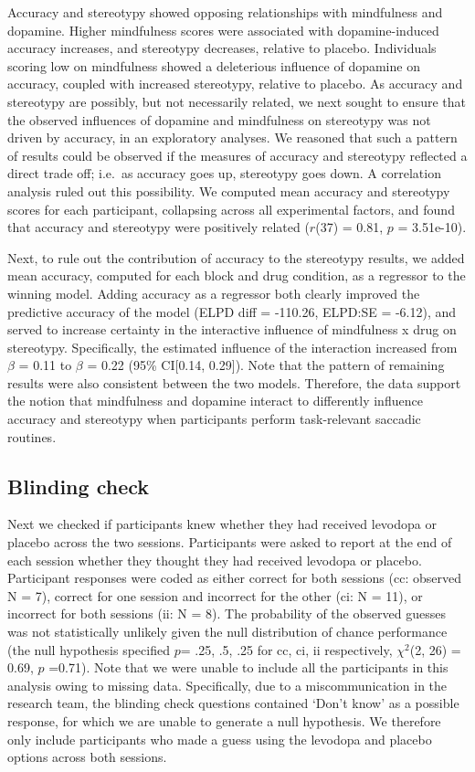 \documentclass{article}
\begin{document}
Accuracy and stereotypy showed opposing relationships with mindfulness
and dopamine. Higher mindfulness scores were associated with
dopamine-induced accuracy increases, and stereotypy decreases, relative
to placebo. Individuals scoring low on mindfulness showed a deleterious
influence of dopamine on accuracy, coupled with increased stereotypy,
relative to placebo. As accuracy and stereotypy are possibly, but not
necessarily related, we next sought to ensure that the observed
influences of dopamine and mindfulness on stereotypy was not driven by
accuracy, in an exploratory analyses. We reasoned that such a pattern of
results could be observed if the measures of accuracy and stereotypy
reflected a direct trade off; i.e.~as accuracy goes up, stereotypy goes
down. A correlation analysis ruled out this possibility. We computed
mean accuracy and stereotypy scores for each participant, collapsing
across all experimental factors, and found that accuracy and stereotypy
were positively related (\(r\)(37) = 0.81, \(p\) = 3.51e-10).

Next, to rule out the contribution of accuracy to the stereotypy
results, we added mean accuracy, computed for each block and drug
condition, as a regressor to the winning model. Adding accuracy as a
regressor both clearly improved the predictive accuracy of the model
(ELPD diff = -110.26, ELPD:SE = -6.12), and served to increase certainty
in the interactive influence of mindfulness x drug on stereotypy.
Specifically, the estimated influence of the interaction increased from
\(\beta\) = 0.11 to \(\beta\) = 0.22 (95\% CI{[}0.14, 0.29{]}). Note
that the pattern of remaining results were also consistent between the
two models. Therefore, the data support the notion that mindfulness and
dopamine interact to differently influence accuracy and stereotypy when
participants perform task-relevant saccadic routines.

\hypertarget{blinding-check}{%
\subsection{Blinding check}\label{blinding-check}}

Next we checked if participants knew whether they had received levodopa
or placebo across the two sessions. Participants were asked to report at
the end of each session whether they thought they had received levodopa
or placebo. Participant responses were coded as either correct for both
sessions (cc: observed N = 7), correct for one session and incorrect for
the other (ci: N = 11), or incorrect for both sessions (ii: N = 8). The
probability of the observed guesses was not statistically unlikely given
the null distribution of chance performance (the null hypothesis
specified \(p\)= .25, .5, .25 for cc, ci, ii respectively, \(\chi^2\)(2,
26) = 0.69, \(p\) =0.71). Note that we were unable to include all the
participants in this analysis owing to missing data. Specifically, due
to a miscommunication in the research team, the blinding check questions
contained `Don't know' as a possible response, for which we are unable
to generate a null hypothesis. We therefore only include participants
who made a guess using the levodopa and placebo options across both
sessions.
\end{document}
